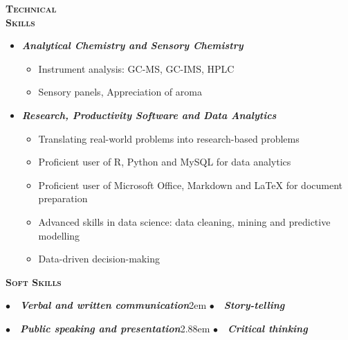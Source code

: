 \documentclass[11pt, a4paper, twoside]{article}
\begin{document}
\vspace{3.5ex}
\begin{minipage}[t]{0.1\textwidth}
\textsc{\textbf{\Large Technical\\Skills}}
  \end{minipage}\hfill
  \begin{minipage}[t]{0.8\textwidth}
    \begin{itemize}[leftmargin=*]
    \setlength\itemsep{-0.5ex}
    \item {\large\textbf{\itshape Analytical Chemistry and Sensory Chemistry}}\vspace{-7pt}
        \begin{itemize}[label=\checkmark]
            \setlength\itemsep{-0.25ex}
            \item Instrument analysis: GC-MS, GC-IMS, HPLC
            \item Sensory panels, Appreciation of aroma
        \end{itemize}
    \item {\large\textbf{\itshape Research, Productivity Software and Data Analytics}}\\\vspace{-7pt}
    \begin{itemize}[label=\checkmark]
            \setlength\itemsep{-0.25ex}
            \item Translating real-world problems into research-based problems
            \item Proficient user of R, Python and MySQL for data analytics
            \item Proficient user of Microsoft Office, Markdown and LaTeX for document preparation
            \item Advanced skills in data science: data cleaning, mining and predictive modelling
            \item Data-driven decision-making
        \end{itemize}
    \end{itemize}
\end{minipage}\par
\vspace{6ex}
\begin{minipage}[t]{0.15\textwidth}
\textsc{\textbf{\Large Soft Skills}}
  \end{minipage}\hfill
  \begin{minipage}[t]{0.8\textwidth}
    $\bullet$~~{\large\textbf{\itshape Verbal and written communication}}\kern2em $\bullet$~~{\large\textbf{\itshape Story-telling}}\par\vspace{1ex}
    $\bullet$~~{\large\textbf{\itshape Public speaking and presentation}}\kern2.88em $\bullet$~~{\large\textbf{\itshape Critical thinking}}\par
\end{minipage}\par
\end{document}
